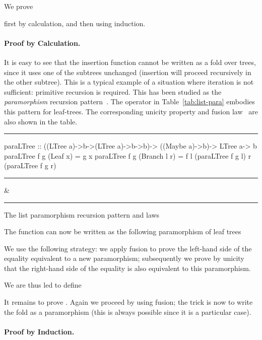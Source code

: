 \documentclass[a4paper,11pt]{llncs}
\begin{document}
We prove


first by calculation, and then using induction. 

\paragraph{Proof by Calculation.}

It is easy to see that the insertion function  cannot be
written as a fold over trees, since it uses one of the subtrees
unchanged (insertion will proceed recursively in the other
subtree). This is a typical example of a situation where iteration is
not sufficient: primitive recursion is required. This has been studied
as the \emph{paramorphism} recursion pattern~\cite{MeertensL:par}. The
operator in Table~\ref{tab:list-para} embodies this pattern for
leaf-trees. The corresponding unicity property and fusion
law~\cite{MeijerE:funpbleb} are also shown in the table.



\begin{table}[tb]
\hrule
\begin{code}
paraLTree :: ((LTree a)->b->(LTree a)->b->b)-> ((Maybe a)->b)-> LTree a-> b
paraLTree f g (Leaf x)     = g x
paraLTree f g (Branch l r) = f l (paraLTree f g l) r (paraLTree f g r)
\end{code}
\hrule


&

\hrule
\caption{The list paramorphism recursion pattern and laws}
\label{tab:list-para}
\end{table}


The function  can now be written as the following
paramorphism of leaf trees


We use the following strategy: we apply fusion to prove the left-hand
side of the equality equivalent to a new paramorphism; subsequently we
prove by unicity that the right-hand side of the equality is also
equivalent to this paramorphism.


We are thus led to define


It remains to prove . Again we proceed by using fusion; the trick is
now to write the fold  as a paramorphism (this is always
possible since it is a particular case).



\paragraph{Proof by Induction.}
\end{document}
